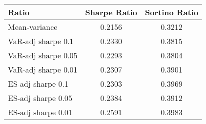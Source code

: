 \begin{tabular}{lcc}
\toprule
Ratio & Sharpe Ratio & Sortino Ratio\\
\midrule
Mean-variance & 0.2156 & 0.3212\\
VaR-adj sharpe 0.1 & 0.2330 & 0.3815\\
VaR-adj sharpe 0.05 & 0.2293 & 0.3804\\
VaR-adj sharpe 0.01 & 0.2307 & 0.3901\\
ES-adj sharpe 0.1 & 0.2303 & 0.3969\\
ES-adj sharpe 0.05 & 0.2384 & 0.3912\\
ES-adj sharpe 0.01 & 0.2591 & 0.3983\\
\bottomrule
\end{tabular}
